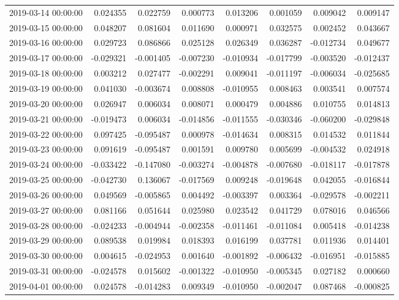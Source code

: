\begin{tabular}{lrrrrrrr}
2019-03-14 00:00:00 & 0.024355 & 0.022759 & 0.000773 & 0.013206 & 0.001059 & 0.009042 & 0.009147 \\
2019-03-15 00:00:00 & 0.048207 & 0.081604 & 0.011690 & 0.000971 & 0.032575 & 0.002452 & 0.043667 \\
2019-03-16 00:00:00 & 0.029723 & 0.086866 & 0.025128 & 0.026349 & 0.036287 & -0.012734 & 0.049677 \\
2019-03-17 00:00:00 & -0.029321 & -0.001405 & -0.007230 & -0.010934 & -0.017799 & -0.003520 & -0.012437 \\
2019-03-18 00:00:00 & 0.003212 & 0.027477 & -0.002291 & 0.009041 & -0.011197 & -0.006034 & -0.025685 \\
2019-03-19 00:00:00 & 0.041030 & -0.003674 & 0.008808 & -0.010955 & 0.008463 & 0.003541 & 0.007574 \\
2019-03-20 00:00:00 & 0.026947 & 0.006034 & 0.008071 & 0.000479 & 0.004886 & 0.010755 & 0.014813 \\
2019-03-21 00:00:00 & -0.019473 & 0.006034 & -0.014856 & -0.011555 & -0.030346 & -0.060200 & -0.029848 \\
2019-03-22 00:00:00 & 0.097425 & -0.095487 & 0.000978 & -0.014634 & 0.008315 & 0.014532 & 0.011844 \\
2019-03-23 00:00:00 & 0.091619 & -0.095487 & 0.001591 & 0.009780 & 0.005699 & -0.004532 & 0.024918 \\
2019-03-24 00:00:00 & -0.033422 & -0.147080 & -0.003274 & -0.004878 & -0.007680 & -0.018117 & -0.017878 \\
2019-03-25 00:00:00 & -0.042730 & 0.136067 & -0.017569 & 0.009248 & -0.019648 & 0.042055 & -0.016844 \\
2019-03-26 00:00:00 & 0.049569 & -0.005865 & 0.004492 & -0.003397 & 0.003364 & -0.029578 & -0.002211 \\
2019-03-27 00:00:00 & 0.081166 & 0.051644 & 0.025980 & 0.023542 & 0.041729 & 0.078016 & 0.046566 \\
2019-03-28 00:00:00 & -0.024233 & -0.004944 & -0.002358 & -0.011461 & -0.011084 & 0.005418 & -0.014238 \\
2019-03-29 00:00:00 & 0.089538 & 0.019984 & 0.018393 & 0.016199 & 0.037781 & 0.011936 & 0.014401 \\
2019-03-30 00:00:00 & 0.004615 & -0.024953 & 0.001640 & -0.001892 & -0.006432 & -0.016951 & -0.015885 \\
2019-03-31 00:00:00 & -0.024578 & 0.015602 & -0.001322 & -0.010950 & -0.005345 & 0.027182 & 0.000660 \\
2019-04-01 00:00:00 & 0.024578 & -0.014283 & 0.009349 & -0.010950 & -0.002047 & 0.087468 & -0.000825 \\

\end{tabular}
